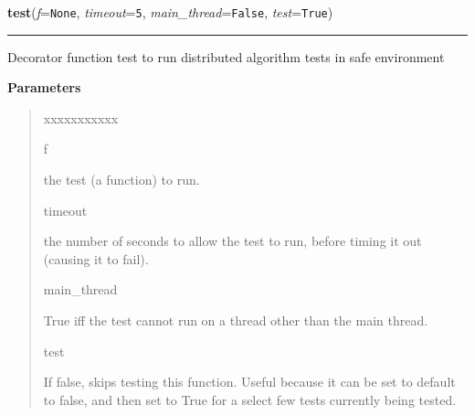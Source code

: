 \hspace{.8\funcindent}\begin{boxedminipage}{\funcwidth}

    \raggedright \textbf{test}(\textit{f}={\tt None}, \textit{timeout}={\tt 5}, \textit{main\_thread}={\tt False}, \textit{test}={\tt True})

    \vspace{-1.5ex}

    \rule{\textwidth}{0.5\fboxrule}
\setlength{\parskip}{2ex}
    Decorator function test to run distributed algorithm tests in safe 
    environment

\setlength{\parskip}{1ex}
      \textbf{Parameters}
      \vspace{-1ex}

      \begin{quote}
        \begin{Ventry}{xxxxxxxxxxx}

          \item[f]

          the test (a function) to run.

          \item[timeout]

          the number of seconds to allow the test to run, before timing it 
          out (causing it to fail).

          \item[main\_thread]

          True iff the test cannot run on a thread other than the main 
          thread.

          \item[test]

          If false, skips testing this function. Useful because it can be 
          set to default to false, and then set to True for a select few 
          tests currently being tested.

        \end{Ventry}

      \end{quote}

    \end{boxedminipage}

    \label{datk:core:tester:print_with_underline}

    \vspace{0.5ex}

